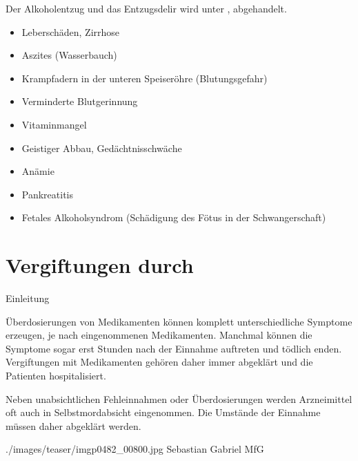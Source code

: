 Der Alkoholentzug und das Entzugsdelir wird unter
, abgehandelt.




{
\begin{itemize}
    \item Leberschäden, Zirrhose
    \item Aszites (Wasserbauch)
    \item Krampfadern in der unteren Speiseröhre  (Blutungsgefahr)
    \item Verminderte Blutgerinnung
    \item Vitaminmangel
    \item Geistiger Abbau, Gedächtnisschwäche
    \item Anämie
    \item Pankreatitis
    \item Fetales Alkoholsyndrom (Schädigung des Fötus in der Schwangerschaft)
    \cite{Jones1973,Guerri2009}
\end{itemize}
}{	

}{}{}{}













\section{Vergiftungen durch }


\TextSlideTeaser
{Einleitung}%
{%
Überdosierungen von Medikamenten können komplett
unterschiedliche Symptome erzeugen, je nach eingenommenen
Medikamenten. Manchmal können die Symptome sogar erst Stunden
nach der Einnahme auftreten und tödlich enden. Vergiftungen
mit Medikamenten gehören daher immer abgeklärt und die
Patienten hospitalisiert. 

Neben unabsichtlichen Fehleinnahmen oder Überdosierungen
werden Arzneimittel oft auch in Selbstmordabsicht
eingenommen. Die Umstände der Einnahme müssen daher
abgeklärt werden.}%
{}%
{./images/teaser/imgp0482_00800.jpg}%
{}%
{}%
{Sebastian Gabriel}%
{MfG}%



